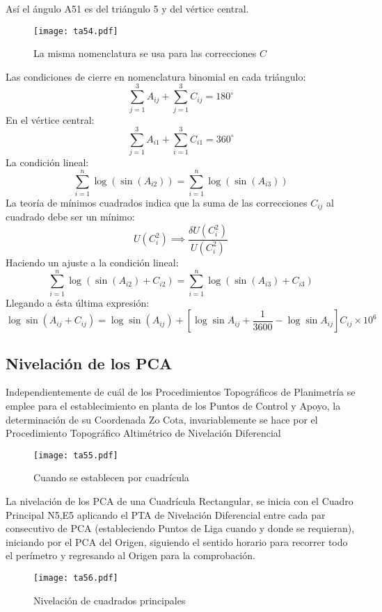 Así el ángulo A51 es del triángulo 5 y del vértice central.

\begin{figure}[h!]
\centering
  \texttt{[image: ta54.pdf]}
  \caption{La misma nomenclatura se usa para las correcciones $C$}
  \label{ta54}
\end{figure}

Las condiciones de cierre en nomenclatura binomial en cada triángulo:
\begin{equation}
    \sum_{j = 1}^3 A_{ij} +\sum_{j =1}^3 C_{ij} = 180^{\circ}
\end{equation}
En el vértice central:
\begin{equation}
    \sum_{j = 1}^3 A_{i1} +\sum_{i=1}^3 C_{i1} = 360^{\circ}
\end{equation}
La condición lineal:
\begin{equation}
\sum_{i = 1}^n \log{\left(\sin{(A_{i2})}\right)} =\sum_{i = 1}^n \log{\left(\sin{(A_{i3})}\right)}
\end{equation}
La teoría de mínimos cuadrados indica que la suma de las correcciones $C_{ij}$ al cuadrado debe ser un mínimo:
\begin{equation}
    U(C_i^2)\implies \frac{\delta U(C_i^2)}{U(C_i^2)}
\end{equation}
Haciendo un ajuste a la condición lineal:
\begin{equation*}
    \sum_{i = 1}^n \log{\left(\sin{(A_{i2}) + C_{i2}}\right)} =\sum_{i = 1}^n \log{\left(\sin{(A_{i3}) + C_{i3}}\right)}
\end{equation*}
Llegando a ésta última expresión:
\begin{equation}
    \log{\sin{\left(A_{ij} + C_{ij}\right)}} = \log{\sin{\left(A_{ij}\right)}} + \left[\log{\sin{A_{ij} + \frac{1}{3600}}} - \log{\sin{A_{ij}}} \right] C_{ij} \times 10^6
\end{equation}
\subsection{Nivelación de los PCA}
Independientemente de cuál de los Procedimientos Topográficos de Planimetría se emplee para el establecimiento en planta de los Puntos de Control y Apoyo, la determinación de su Coordenada Zo Cota, invariablemente se hace por el Procedimiento Topográfico Altimétrico de Nivelación Diferencial
\begin{figure}[h!]
\centering
  \texttt{[image: ta55.pdf]}
  \caption{Cuando se establecen por cuadrícula}
  \label{ta55}
\end{figure}
La nivelación de los PCA de una Cuadrícula Rectangular, se inicia con el Cuadro Principal N5,E5 aplicando el PTA de Nivelación Diferencial entre cada par consecutivo de PCA (estableciendo Puntos de Liga cuando y donde se requieran), iniciando por el PCA del Origen, siguiendo el sentido horario para recorrer todo el perímetro y regresando al Origen para la comprobación.
\begin{figure}[h!]
\centering
  \texttt{[image: ta56.pdf]}
  \caption{Nivelación de cuadrados principales}
  \label{ta56}
\end{figure}
